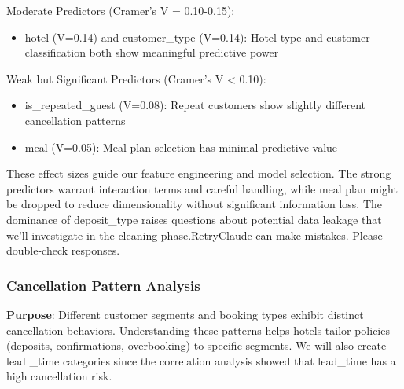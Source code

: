 \documentclass[
  letterpaper,
  DIV=11,
  numbers=noendperiod]{scrartcl}
\providecommand{\tightlist}{%
  \setlength{\itemsep}{0pt}\setlength{\parskip}{0pt}}
\begin{document}
Moderate Predictors (Cramer's V = 0.10-0.15):

\begin{itemize}
\tightlist
\item
  hotel (V=0.14) and customer\_type (V=0.14): Hotel type and customer
  classification both show meaningful predictive power
\end{itemize}

Weak but Significant Predictors (Cramer's V \textless{} 0.10):

\begin{itemize}
\tightlist
\item
  is\_repeated\_guest (V=0.08): Repeat customers show slightly different
  cancellation patterns
\item
  meal (V=0.05): Meal plan selection has minimal predictive value
\end{itemize}

These effect sizes guide our feature engineering and model selection.
The strong predictors warrant interaction terms and careful handling,
while meal plan might be dropped to reduce dimensionality without
significant information loss. The dominance of deposit\_type raises
questions about potential data leakage that we'll investigate in the
cleaning phase.RetryClaude can make mistakes. Please double-check
responses.

\subsubsection{Cancellation Pattern
Analysis}\label{cancellation-pattern-analysis}

\textbf{Purpose}: Different customer segments and booking types exhibit
distinct cancellation behaviors. Understanding these patterns helps
hotels tailor policies (deposits, confirmations, overbooking) to
specific segments. We will also create lead \_time categories since the
correlation analysis showed that lead\_time has a high cancellation
risk.
\end{document}
